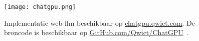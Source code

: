 \begin{figure}
    \texttt{[image: chatgpu.png]}
    \caption[Implementatie web-llm~\autocite{mlcai2023, Qwict2024a}]{
        Implementatie web-llm beschikbaar op \href{https://chatgpu.qwict.com}{chatgpu.qwict.com}. De broncode is beschikbaar op \href{https://github.com/qwict/chatgpu}{GitHub.com/Qwict/ChatGPU}~\autocite{mlcai2023, Qwict2024a}.
    }
    \label{fig:Implementatie web-llm}
\end{figure}